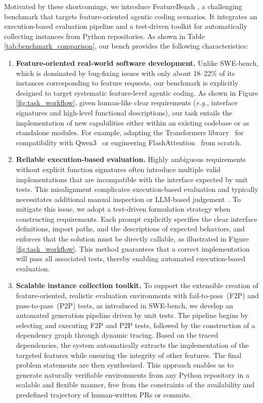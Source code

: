 \documentclass{article}
\def\name{FeatureBench }
\begin{document}
Motivated by these shortcomings, we introduce \name, a challenging benchmark that targets feature-oriented agentic coding scenarios. It integrates an execution-based evaluation pipeline and a test-driven toolkit for automatically collecting instances from Python repositories. As shown in Table \ref{tab:benchmark_comparison}, our bench provides the following characteristics: 
\begin{enumerate}[label=\textbf{\arabic*.},leftmargin=10pt,itemindent=0pt]
    \setlength{\itemsep}{0pt}
    \setlength{\parsep}{0pt}
    \setlength{\parskip}{0pt}
    \item \textbf{Feature-oriented real-world software development.} Unlike SWE-bench, which is dominated by bug-fixing issues with only about 18–22\% of its instances corresponding to feature requests, our benchmark is explicitly designed to target systematic feature-level agentic coding. As shown in Figure \ref{fig:task_workflow}, given human-like clear requirements (\textit{e.g.}, interface signatures and high-level functional descriptions), our task entails the implementation of new capabilities either within an existing codebase or as standalone modules. For example, adapting the Transformers library~\citep{transformerslib} for compatibility with Qwen3~\citep{yang2025qwen3} or engineering FlashAttention~\citep{dao2022flashattention} from scratch.
    \item \textbf{Reliable execution-based evaluation.}  Highly ambiguous requirements without explicit function signatures often introduce multiple valid implementations that are incompatible with the interface expected by unit tests. This misalignment complicates execution-based evaluation and typically necessitates additional manual inspection or LLM-based judgement~\citep{starace2025paperbench,seo2025paper2code}. To mitigate this issue, we adopt a test-driven formulation strategy when constructing requirements.  Each prompt explicitly specifies the clear interface definitions, import paths, and the descriptions of expected behaviors, and enforces that the solution must be directly callable, as illustrated in Figure \ref{fig:task_workflow}. This method guarantees that a correct implementation will pass all associated tests, thereby enabling automated execution-based evaluation. 
    \item \textbf{Scalable instance collection toolkit.} To support the extensible creation of feature-oriented, realistic evaluation environments with fail-to-pass~(F2P) and pass-to-pass~(P2P) tests, as introduced in SWE-bench, we develop an automated generation pipeline driven by unit tests. The pipeline begins by selecting and executing F2P and P2P tests, followed by the construction of a dependency graph through dynamic tracing. Based on the traced dependencies, the system automatically extracts the implementation of the targeted features while ensuring the integrity of other features. The final problem statements are then synthesized. This approach enables us to generate naturally verifiable environments from any Python repository in a scalable and flexible manner, free from the constraints of the availability and predefined trajectory of human-written PRs or commits. 

\end{enumerate}
\end{document}
